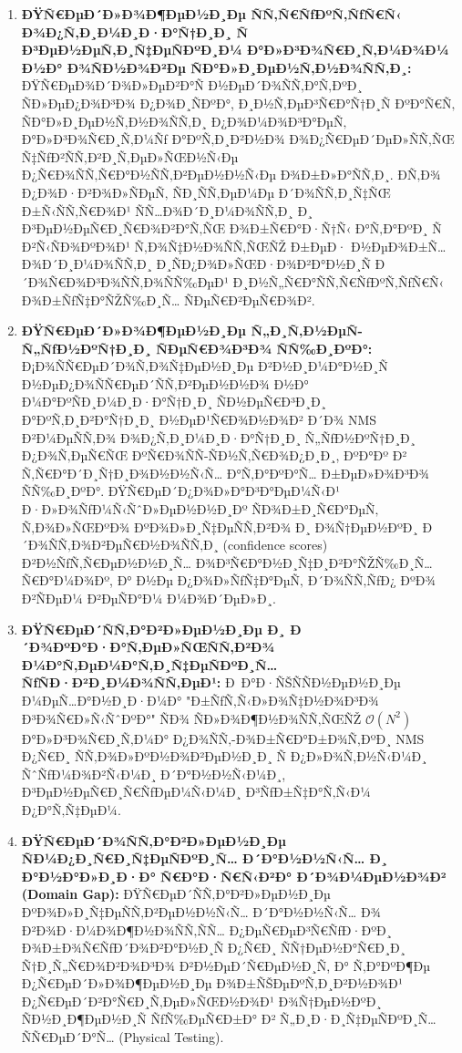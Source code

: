 \documentclass[]{article}
\begin{document}
\begin{enumerate}
\def\labelenumi{\arabic{enumi}.}
\item
  \textbf{ÐŸÑ€ÐµÐ´Ð»Ð¾Ð¶ÐµÐ½Ð¸Ðµ ÑÑ‚Ñ€ÑƒÐºÑ‚ÑƒÑ€Ñ‹ Ð¾Ð¿Ñ‚Ð¸Ð¼Ð¸Ð·Ð°Ñ†Ð¸Ð¸ Ñ Ð³ÐµÐ½ÐµÑ‚Ð¸Ñ‡ÐµÑÐºÐ¸Ð¼ Ð°Ð»Ð³Ð¾Ñ€Ð¸Ñ‚Ð¼Ð¾Ð¼ Ð½Ð° Ð¾ÑÐ½Ð¾Ð²Ðµ ÑÐ°Ð»Ð¸ÐµÐ½Ñ‚Ð½Ð¾ÑÑ‚Ð¸:} ÐŸÑ€ÐµÐ¾Ð´Ð¾Ð»ÐµÐ²Ð°Ñ Ð½ÐµÐ´Ð¾ÑÑ‚Ð°Ñ‚ÐºÐ¸ ÑÐ»ÐµÐ¿Ð¾Ð³Ð¾ Ð¿Ð¾Ð¸ÑÐºÐ°, Ð¸Ð½Ñ‚ÐµÐ³Ñ€Ð°Ñ†Ð¸Ñ ÐºÐ°Ñ€Ñ‚ ÑÐ°Ð»Ð¸ÐµÐ½Ñ‚Ð½Ð¾ÑÑ‚Ð¸ Ð¿Ð¾Ð¼Ð¾Ð³Ð°ÐµÑ‚ Ð°Ð»Ð³Ð¾Ñ€Ð¸Ñ‚Ð¼Ñƒ Ð°ÐºÑ‚Ð¸Ð²Ð½Ð¾ Ð¾Ð¿Ñ€ÐµÐ´ÐµÐ»ÑÑ‚ÑŒ Ñ‡ÑƒÐ²ÑÑ‚Ð²Ð¸Ñ‚ÐµÐ»ÑŒÐ½Ñ‹Ðµ Ð¿Ñ€Ð¾ÑÑ‚Ñ€Ð°Ð½ÑÑ‚Ð²ÐµÐ½Ð½Ñ‹Ðµ Ð¾Ð±Ð»Ð°ÑÑ‚Ð¸. Ð­Ñ‚Ð¾ Ð¿Ð¾Ð·Ð²Ð¾Ð»ÑÐµÑ‚ ÑÐ¸ÑÑ‚ÐµÐ¼Ðµ Ð´Ð¾ÑÑ‚Ð¸Ñ‡ÑŒ Ð±Ñ‹ÑÑ‚Ñ€Ð¾Ð¹ ÑÑ…Ð¾Ð´Ð¸Ð¼Ð¾ÑÑ‚Ð¸ Ð¸ Ð³ÐµÐ½ÐµÑ€Ð¸Ñ€Ð¾Ð²Ð°Ñ‚ÑŒ Ð¾Ð±Ñ€Ð°Ð·Ñ†Ñ‹ Ð°Ñ‚Ð°ÐºÐ¸ Ñ Ð²Ñ‹ÑÐ¾ÐºÐ¾Ð¹ Ñ‚Ð¾Ñ‡Ð½Ð¾ÑÑ‚ÑŒÑŽ Ð±ÐµÐ· Ð½ÐµÐ¾Ð±Ñ…Ð¾Ð´Ð¸Ð¼Ð¾ÑÑ‚Ð¸ Ð¸ÑÐ¿Ð¾Ð»ÑŒÐ·Ð¾Ð²Ð°Ð½Ð¸Ñ Ð´Ð¾Ñ€Ð¾Ð³Ð¾ÑÑ‚Ð¾ÑÑ‰ÐµÐ¹ Ð¸Ð½Ñ„Ñ€Ð°ÑÑ‚Ñ€ÑƒÐºÑ‚ÑƒÑ€Ñ‹ Ð¾Ð±ÑƒÑ‡Ð°ÑŽÑ‰Ð¸Ñ… ÑÐµÑ€Ð²ÐµÑ€Ð¾Ð².
\item
  \textbf{ÐŸÑ€ÐµÐ´Ð»Ð¾Ð¶ÐµÐ½Ð¸Ðµ Ñ„Ð¸Ñ‚Ð½ÐµÑ-Ñ„ÑƒÐ½ÐºÑ†Ð¸Ð¸ ÑÐµÑ€Ð¾Ð³Ð¾ ÑÑ‰Ð¸ÐºÐ°:} Ð¡Ð¾ÑÑ€ÐµÐ´Ð¾Ñ‚Ð¾Ñ‡ÐµÐ½Ð¸Ðµ Ð²Ð½Ð¸Ð¼Ð°Ð½Ð¸Ñ Ð½ÐµÐ¿Ð¾ÑÑ€ÐµÐ´ÑÑ‚Ð²ÐµÐ½Ð½Ð¾ Ð½Ð° Ð¼Ð°ÐºÑÐ¸Ð¼Ð¸Ð·Ð°Ñ†Ð¸Ð¸ ÑÐ½ÐµÑ€Ð³Ð¸Ð¸ Ð°ÐºÑ‚Ð¸Ð²Ð°Ñ†Ð¸Ð¸ Ð½ÐµÐ¹Ñ€Ð¾Ð½Ð¾Ð² Ð´Ð¾ NMS Ð²Ð¼ÐµÑÑ‚Ð¾ Ð¾Ð¿Ñ‚Ð¸Ð¼Ð¸Ð·Ð°Ñ†Ð¸Ð¸ Ñ„ÑƒÐ½ÐºÑ†Ð¸Ð¸ Ð¿Ð¾Ñ‚ÐµÑ€ÑŒ ÐºÑ€Ð¾ÑÑ-ÑÐ½Ñ‚Ñ€Ð¾Ð¿Ð¸Ð¸, ÐºÐ°Ðº Ð² Ñ‚Ñ€Ð°Ð´Ð¸Ñ†Ð¸Ð¾Ð½Ð½Ñ‹Ñ… Ð°Ñ‚Ð°ÐºÐ°Ñ… Ð±ÐµÐ»Ð¾Ð³Ð¾ ÑÑ‰Ð¸ÐºÐ°. ÐŸÑ€ÐµÐ´Ð¿Ð¾Ð»Ð°Ð³Ð°ÐµÐ¼Ñ‹Ð¹ Ð·Ð»Ð¾ÑƒÐ¼Ñ‹ÑˆÐ»ÐµÐ½Ð½Ð¸Ðº ÑÐ¾Ð±Ð¸Ñ€Ð°ÐµÑ‚ Ñ‚Ð¾Ð»ÑŒÐºÐ¾ ÐºÐ¾Ð»Ð¸Ñ‡ÐµÑÑ‚Ð²Ð¾ Ð¸ Ð¾Ñ†ÐµÐ½ÐºÐ¸ Ð´Ð¾ÑÑ‚Ð¾Ð²ÐµÑ€Ð½Ð¾ÑÑ‚Ð¸ (confidence scores) Ð²Ð½ÑƒÑ‚Ñ€ÐµÐ½Ð½Ð¸Ñ… Ð¾Ð³Ñ€Ð°Ð½Ð¸Ñ‡Ð¸Ð²Ð°ÑŽÑ‰Ð¸Ñ… Ñ€Ð°Ð¼Ð¾Ðº, Ð° Ð½Ðµ Ð¿Ð¾Ð»ÑƒÑ‡Ð°ÐµÑ‚ Ð´Ð¾ÑÑ‚ÑƒÐ¿ ÐºÐ¾ Ð²ÑÐµÐ¼ Ð²ÐµÑÐ°Ð¼ Ð¼Ð¾Ð´ÐµÐ»Ð¸.
\item
  \textbf{ÐŸÑ€ÐµÐ´ÑÑ‚Ð°Ð²Ð»ÐµÐ½Ð¸Ðµ Ð¸ Ð´Ð¾ÐºÐ°Ð·Ð°Ñ‚ÐµÐ»ÑŒÑÑ‚Ð²Ð¾ Ð¼Ð°Ñ‚ÐµÐ¼Ð°Ñ‚Ð¸Ñ‡ÐµÑÐºÐ¸Ñ… ÑƒÑÐ·Ð²Ð¸Ð¼Ð¾ÑÑ‚ÐµÐ¹:} Ð Ð°Ð·ÑŠÑÑÐ½ÐµÐ½Ð¸Ðµ Ð¼ÐµÑ…Ð°Ð½Ð¸Ð·Ð¼Ð° "Ð±ÑƒÑ‚Ñ‹Ð»Ð¾Ñ‡Ð½Ð¾Ð³Ð¾ Ð³Ð¾Ñ€Ð»Ñ‹ÑˆÐºÐ°" ÑÐ¾ ÑÐ»Ð¾Ð¶Ð½Ð¾ÑÑ‚ÑŒÑŽ \(\mathcal{O}\left( N^{2} \right)\ \) Ð°Ð»Ð³Ð¾Ñ€Ð¸Ñ‚Ð¼Ð° Ð¿Ð¾ÑÑ‚-Ð¾Ð±Ñ€Ð°Ð±Ð¾Ñ‚ÐºÐ¸ NMS Ð¿Ñ€Ð¸ ÑÑ‚Ð¾Ð»ÐºÐ½Ð¾Ð²ÐµÐ½Ð¸Ð¸ Ñ Ð¿Ð»Ð¾Ñ‚Ð½Ñ‹Ð¼Ð¸ ÑˆÑƒÐ¼Ð¾Ð²Ñ‹Ð¼Ð¸ Ð´Ð°Ð½Ð½Ñ‹Ð¼Ð¸, Ð³ÐµÐ½ÐµÑ€Ð¸Ñ€ÑƒÐµÐ¼Ñ‹Ð¼Ð¸ Ð³ÑƒÐ±Ñ‡Ð°Ñ‚Ñ‹Ð¼ Ð¿Ð°Ñ‚Ñ‡ÐµÐ¼.
\item
  \textbf{ÐŸÑ€ÐµÐ´Ð¾ÑÑ‚Ð°Ð²Ð»ÐµÐ½Ð¸Ðµ ÑÐ¼Ð¿Ð¸Ñ€Ð¸Ñ‡ÐµÑÐºÐ¸Ñ… Ð´Ð°Ð½Ð½Ñ‹Ñ… Ð¸ Ð°Ð½Ð°Ð»Ð¸Ð·Ð° Ñ€Ð°Ð·Ñ€Ñ‹Ð²Ð° Ð´Ð¾Ð¼ÐµÐ½Ð¾Ð² (Domain Gap):} ÐŸÑ€ÐµÐ´ÑÑ‚Ð°Ð²Ð»ÐµÐ½Ð¸Ðµ ÐºÐ¾Ð»Ð¸Ñ‡ÐµÑÑ‚Ð²ÐµÐ½Ð½Ñ‹Ñ… Ð´Ð°Ð½Ð½Ñ‹Ñ… Ð¾ Ð²Ð¾Ð·Ð¼Ð¾Ð¶Ð½Ð¾ÑÑ‚ÑÑ… Ð¿ÐµÑ€ÐµÐ³Ñ€ÑƒÐ·ÐºÐ¸ Ð¾Ð±Ð¾Ñ€ÑƒÐ´Ð¾Ð²Ð°Ð½Ð¸Ñ Ð¿Ñ€Ð¸ ÑÑ†ÐµÐ½Ð°Ñ€Ð¸Ð¸ Ñ†Ð¸Ñ„Ñ€Ð¾Ð²Ð¾Ð³Ð¾ Ð²Ð½ÐµÐ´Ñ€ÐµÐ½Ð¸Ñ, Ð° Ñ‚Ð°ÐºÐ¶Ðµ Ð¿Ñ€ÐµÐ´Ð»Ð¾Ð¶ÐµÐ½Ð¸Ðµ Ð¾Ð±ÑŠÐµÐºÑ‚Ð¸Ð²Ð½Ð¾Ð¹ Ð¿Ñ€ÐµÐ´Ð²Ð°Ñ€Ð¸Ñ‚ÐµÐ»ÑŒÐ½Ð¾Ð¹ Ð¾Ñ†ÐµÐ½ÐºÐ¸ ÑÐ½Ð¸Ð¶ÐµÐ½Ð¸Ñ ÑƒÑ‰ÐµÑ€Ð±Ð° Ð² Ñ„Ð¸Ð·Ð¸Ñ‡ÐµÑÐºÐ¸Ñ… ÑÑ€ÐµÐ´Ð°Ñ… (Physical Testing).
\end{enumerate}
\end{document}
